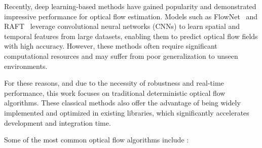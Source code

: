 Recently, deep learning-based methods have gained popularity and demonstrated impressive
performance for optical flow estimation. Models such as FlowNet~\cite{opt_flw_flownet} and
RAFT~\cite{optical_flw_raft} leverage convolutional neural networks (CNNs) to learn spatial and temporal
features from large datasets, enabling them to predict optical flow fields with high accuracy. However,
these methods often require significant computational resources and may suffer from poor
generalization to unseen environments.

For these reasons, and due to the necessity of robustness and real-time performance, this work focuses
on traditional deterministic optical flow algorithms. These classical methods also offer the advantage
of being widely implemented and optimized in existing libraries, which significantly accelerates
development and integration time.

Some of the most common optical flow algorithms include \cite{optical_flow_estimation_survey,opt_flw_old_survey}: 

